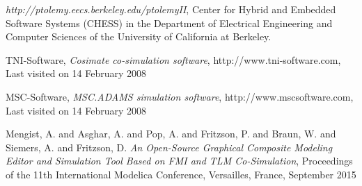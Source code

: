 \begin{thebibliography}{14}

 {\em http://ptolemy.eecs.berkeley.edu/ptolemyII},
	Center for Hybrid and Embedded Software Systems (CHESS) in the
	Department of Electrical Engineering and Computer Sciences of
	the University of California at Berkeley.









 TNI-Software,
	{\em Cosimate co-simulation software},
	http://www.tni-software.com,
	Last visited on 14 February 2008



 MSC-Software,
	{\em MSC.ADAMS simulation software},
	http://www.mscsoftware.com, 
	Last visited on 14 February 2008
	
 Mengist, A. and Asghar, A. and Pop, A. and Fritzson, P. and Braun, W. and Siemers, A. and Fritzson, D.
	 {\em An Open-Source Graphical Composite Modeling Editor and Simulation Tool Based on {FM}I and {TLM} Co-Simulation},
		Proceedings of the 11th International Modelica Conference, Versailles, France, September 2015

\end{thebibliography}
